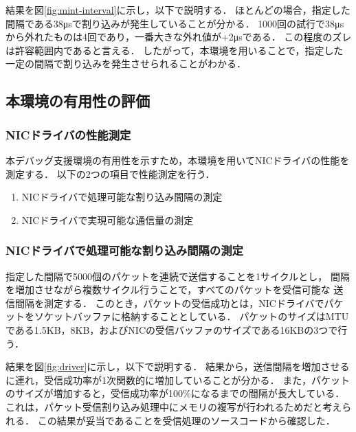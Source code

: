 \documentclass[submit,techreq,noauthor,dvipdfmx]{ipsj}
\begin{document}
結果を図\ref{fig:mint-interval}に示し，以下で説明する．
ほとんどの場合，指定した間隔である38μsで割り込みが発生していることが分かる．
1000回の試行で38μsから外れたものは4回であり，一番大きな外れ値が+2μsである．
この程度のズレは許容範囲内であると言える．
したがって，本環境を用いることで，指定した一定の間隔で割り込みを発生させられることがわかる．

\subsection{本環境の有用性の評価}\label{sec:interval}

\subsubsection{NICドライバの性能測定}\label{sec:interval}

本デバッグ支援環境の有用性を示すため，本環境を用いてNICドライバの性能を測定する．
以下の2つの項目で性能測定を行う．
\begin{enumerate}
    \item NICドライバで処理可能な割り込み間隔の測定
    \item NICドライバで実現可能な通信量の測定
\end{enumerate}

\subsubsection{NICドライバで処理可能な割り込み間隔の測定}\label{sec:mint-interval}
指定した間隔で5000個のパケットを連続で送信することを1サイクルとし，
間隔を増加させながら複数サイクル行うことで，すべてのパケットを受信可能な
送信間隔を測定する．
このとき，パケットの受信成功とは，NICドライバでパケットをソケットバッファに格納することとしている．
パケットのサイズはMTUである1.5KB，8KB，およびNICの受信バッファのサイズである16KBの3つで行う．

結果を図\ref{fig:driver}に示し，以下で説明する．
結果から，送信間隔を増加させるに連れ，受信成功率が1次関数的に増加していることが分かる．
また，パケットのサイズが増加すると，受信成功率が100\%になるまでの間隔が長大している．
これは，パケット受信割り込み処理中にメモリの複写が行われるためだと考えられる．
この結果が妥当であることを受信処理のソースコードから確認した．
\end{document}

